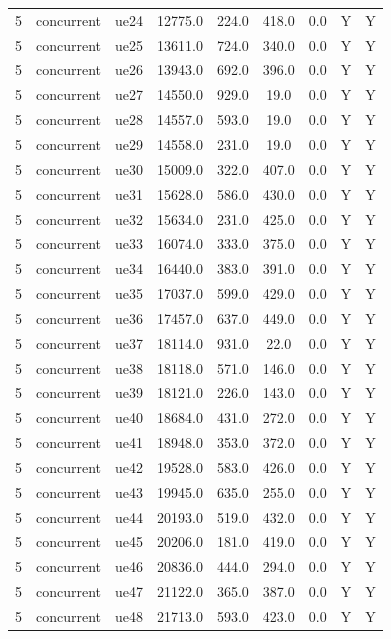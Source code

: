 \begin{table}[ht]
\begin{tabular}{|c|c|c|c|c|c|c|c|c|}
5 & concurrent & ue24 & 12775.0 & 224.0 & 418.0 & 0.0 & Y & Y \\
5 & concurrent & ue25 & 13611.0 & 724.0 & 340.0 & 0.0 & Y & Y \\
5 & concurrent & ue26 & 13943.0 & 692.0 & 396.0 & 0.0 & Y & Y \\
5 & concurrent & ue27 & 14550.0 & 929.0 & 19.0 & 0.0 & Y & Y \\
5 & concurrent & ue28 & 14557.0 & 593.0 & 19.0 & 0.0 & Y & Y \\
5 & concurrent & ue29 & 14558.0 & 231.0 & 19.0 & 0.0 & Y & Y \\
5 & concurrent & ue30 & 15009.0 & 322.0 & 407.0 & 0.0 & Y & Y \\
5 & concurrent & ue31 & 15628.0 & 586.0 & 430.0 & 0.0 & Y & Y \\
5 & concurrent & ue32 & 15634.0 & 231.0 & 425.0 & 0.0 & Y & Y \\
5 & concurrent & ue33 & 16074.0 & 333.0 & 375.0 & 0.0 & Y & Y \\
5 & concurrent & ue34 & 16440.0 & 383.0 & 391.0 & 0.0 & Y & Y \\
5 & concurrent & ue35 & 17037.0 & 599.0 & 429.0 & 0.0 & Y & Y \\
5 & concurrent & ue36 & 17457.0 & 637.0 & 449.0 & 0.0 & Y & Y \\
5 & concurrent & ue37 & 18114.0 & 931.0 & 22.0 & 0.0 & Y & Y \\
5 & concurrent & ue38 & 18118.0 & 571.0 & 146.0 & 0.0 & Y & Y \\
5 & concurrent & ue39 & 18121.0 & 226.0 & 143.0 & 0.0 & Y & Y \\
5 & concurrent & ue40 & 18684.0 & 431.0 & 272.0 & 0.0 & Y & Y \\
5 & concurrent & ue41 & 18948.0 & 353.0 & 372.0 & 0.0 & Y & Y \\
5 & concurrent & ue42 & 19528.0 & 583.0 & 426.0 & 0.0 & Y & Y \\
5 & concurrent & ue43 & 19945.0 & 635.0 & 255.0 & 0.0 & Y & Y \\
5 & concurrent & ue44 & 20193.0 & 519.0 & 432.0 & 0.0 & Y & Y \\
5 & concurrent & ue45 & 20206.0 & 181.0 & 419.0 & 0.0 & Y & Y \\
5 & concurrent & ue46 & 20836.0 & 444.0 & 294.0 & 0.0 & Y & Y \\
5 & concurrent & ue47 & 21122.0 & 365.0 & 387.0 & 0.0 & Y & Y \\
5 & concurrent & ue48 & 21713.0 & 593.0 & 423.0 & 0.0 & Y & Y \\

\end{tabular}
\end{table}
